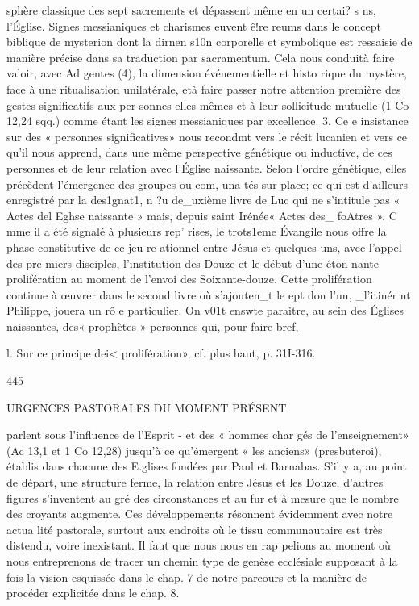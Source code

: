 sphère classique des sept sacrements et dépassent même en un certai? s ns, l'Église. Signes messianiques et charismes euvent ê!re reums dans le concept biblique de mysterion dont la dirnen­ s10n corporelle et symbolique est ressaisie de manière précise dans sa traduction par sacramentum. Cela nous conduità faire valoir, avec Ad gentes (4), la dimension événementielle et histo­ rique du mystère, face à une ritualisation unilatérale, età faire passer notre attention première des gestes significatifs aux per­ sonnes elles-mêmes et à leur sollicitude mutuelle (1 Co 12,24 sqq.) comme étant les signes messianiques par excellence.
3. Ce e insistance sur des « personnes significatives» nous recondmt vers le récit lucanien et vers ce qu'il nous apprend, dans une même perspective génétique ou inductive, de ces personnes et de leur relation avec l'Église naissante. Selon l'ordre génétique, elles précèdent l'émergence des groupes ou com, una tés sur place; ce qui est d'ailleurs enregistré par la des1gnat1, n ?u de_uxième livre de Luc qui ne s'intitule pas
« Actes del Eghse naissante » mais, depuis saint Irénée« Actes des_ foAtres ». C mme il a été signalé à plusieurs rep' rises, le
trots1eme Évangile nous offre la phase constitutive de ce jeu
re ationnel entre Jésus et quelques-uns, avec l'appel des pre­ miers disciples, l'institution des Douze et le début d'une éton­ nante prolifération au moment de l'envoi des Soixante-douze. Cette prolifération continue à œuvrer dans le second livre où s'ajouten_t le  ept don l'un, _l'itinér nt Philippe, jouera un rô e particulier. On v01t enswte paraitre, au sein des Églises naissantes, des« prophètes »  personnes qui, pour faire bref,

l. Sur ce principe dei< prolifération», cf. plus haut, p. 31I-316.

445
 
URGENCES PASTORALES DU MOMENT PRÉSENT

parlent sous l'influence de l'Esprit - et des « hommes char­ gés de l'enseignement» (Ac 13,1 et 1 Co 12,28) jusqu'à ce qu'émergent « les anciens» (presbuteroi), établis dans chacune des E.glises fondées par Paul et Barnabas. S'il y a, au point de départ, une structure ferme, la relation entre Jésus et les Douze, d'autres figures s'inventent au gré des circonstances et au fur et à mesure que le nombre des croyants augmente.
Ces développements résonnent évidemment avec notre actua­ lité pastorale, surtout aux endroits où le tissu communautaire est très distendu, voire inexistant. Il faut que nous nous en rap­ pelions au moment où nous entreprenons de tracer un chemin type de genèse ecclésiale supposant à la fois la vision esquissée dans le chap. 7 de notre parcours et la manière de procéder explicitée dans le chap. 8.


